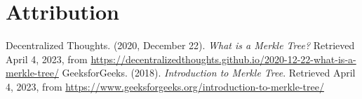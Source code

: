 \documentclass{article}
\begin{document}
\section{Attribution}

\begin{thebibliography}{9}
Decentralized Thoughts. (2020, December 22). \textit{What is a Merkle Tree?} Retrieved April 4, 2023, from \url{https://decentralizedthoughts.github.io/2020-12-22-what-is-a-merkle-tree/}
GeeksforGeeks. (2018). \textit{Introduction to Merkle Tree}. Retrieved April 4, 2023, from \url{https://www.geeksforgeeks.org/introduction-to-merkle-tree/}

  \end{thebibliography}
\end{document}
